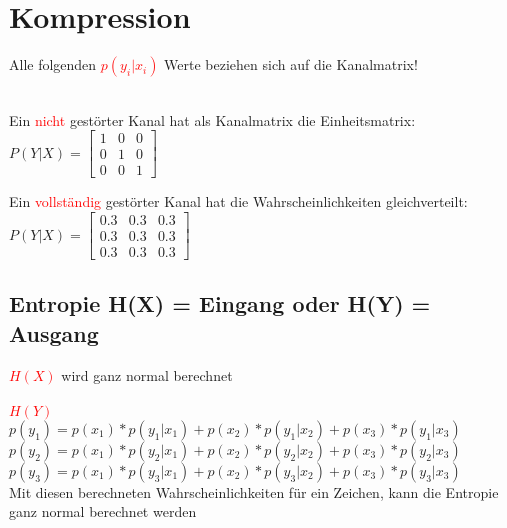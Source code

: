 
\section{Kompression}

Alle folgenden \textcolor{red}{$p(y_i|x_i)$} Werte beziehen sich auf die Kanalmatrix!\\\\
\begin{minipage}[t]{0.15\textwidth}
    Ein \textcolor{red}{nicht} gestörter Kanal hat als Kanalmatrix die Einheitsmatrix:\\
    $P(Y|X) = \begin{bmatrix}
                  1 & 0 & 0\\
                  0 & 1 & 0\\
                  0 & 0 & 1
    \end{bmatrix}$
\end{minipage}
\hfill
\begin{minipage}[t]{0.15\textwidth}
    Ein \textcolor{red}{vollständig} gestörter Kanal hat die Wahrscheinlichkeiten gleichverteilt:\\
    $P(Y|X) = \begin{bmatrix}
                  0.3 & 0.3 & 0.3\\
                  0.3 & 0.3 & 0.3\\
                  0.3 & 0.3 & 0.3
    \end{bmatrix}$
\end{minipage}


\subsection{Entropie H(X) = Eingang oder H(Y) = Ausgang}
\textcolor{red}{$H(X)$} wird ganz normal berechnet\\\\
\textcolor{red}{$H(Y)$} \\
\colorbox{lightlightgrey}{$p(y_1) = p(x_1)*p(y_1|x_1) + p(x_2)*p(y_1|x_2) + p(x_3)*p(y_1|x_3)$}\\
\colorbox{lightlightgrey}{$p(y_2) = p(x_1)*p(y_2|x_1) + p(x_2)*p(y_2|x_2) + p(x_3)*p(y_2|x_3)$}\\
\colorbox{lightlightgrey}{$p(y_3) = p(x_1)*p(y_3|x_1) + p(x_2)*p(y_3|x_2) + p(x_3)*p(y_3|x_3)$}\\
Mit diesen berechneten Wahrscheinlichkeiten für ein Zeichen, kann die Entropie ganz normal berechnet werden


